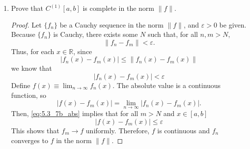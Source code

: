\documentclass{article}
\begin{document}
\begin{enumerate}
\begin{enumerate}
\begin{description}
                        \end{description}
                  \item Prove that $C^{(1)}[a,b]$ is complete in the norm
                        $\lVert f\rVert$.
                        \begin{proof}
                              Let $\{f_n\}$ be a Cauchy sequence in the norm
                              $\lVert f\rVert$, and $\varepsilon>0$ be given.
                              Because $\{f_n\}$ is Cauchy, there exists some $N$
                              such that, for all $n,m>N$,
                              \begin{equation}
                                    \lVert f_n-f_m\rVert<\varepsilon.
                              \end{equation}
                              Thus, for each $x\in\mathbb{R}$, since
                              \begin{equation}
                                    \lvert f_n(x)-f_m(x)\rvert \leq \lVert f_n(x)-f_m(x)\rVert
                              \end{equation}
                              we know that
                              \begin{equation}
                                    \lvert f_n(x)-f_m(x)\rvert < \varepsilon
                                    \label{eq:5.3_7b_abs}
                              \end{equation}
                              Define $f(x)\equiv \lim_{n\to\infty}f_n(x)$. The
                              absolute value is a continuous function, so
                              \begin{equation*}
                                    \lvert f(x)-f_m(x)\rvert = \lim_{n\to\infty}\lvert f_n(x)-f_m(x)\rvert.
                              \end{equation*}
                              Then, \eqref{eq:5.3_7b_abs} implies that for all
                              $m>N$ and $x\in[a,b]$
                              \[
                                    \lvert f(x)-f_m(x)\rvert \leq \varepsilon
                              \]
                              This shows that $f_m\to f$ uniformly. Therefore,
                              $f$ is continuous and $f_n$ converges to $f$ in
                              the norm $\lVert f\rVert$.
                        \end{proof}
            \end{enumerate}
\end{enumerate}
\end{document}
